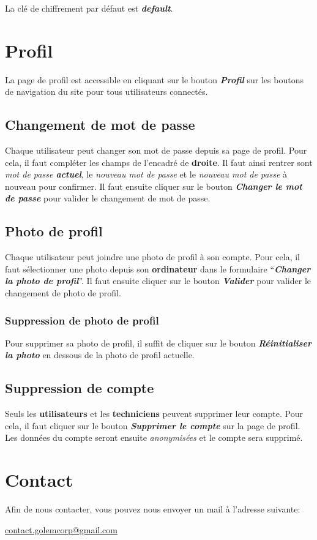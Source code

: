 \documentclass[12pt, a4paper]{article}
\begin{document}
\noindent La clé de chiffrement par défaut est \textit{\textbf{default}}.

\section{Profil}

La page de profil est accessible en cliquant sur le bouton \textit{\textbf{Profil}} sur les boutons de navigation du site pour tous utilisateurs connectés.

\subsection*{Changement de mot de passe}

Chaque utilisateur peut changer son mot de passe depuis sa page de profil.
Pour cela, il faut compléter les champs de l'encadré de \textbf{droite}.
Il faut ainsi rentrer sont \textit{mot de passe \textbf{actuel}}, le \textit{nouveau mot de passe} et le \textit{nouveau mot de passe} à nouveau pour confirmer.
Il faut ensuite cliquer sur le bouton \textit{\textbf{Changer le mot de passe}} pour valider le changement de mot de passe.

\subsection*{Photo de profil}

Chaque utilisateur peut joindre une photo de profil à son compte.
Pour cela, il faut sélectionner une photo depuis son \textbf{ordinateur} dans le formulaire ``\textit{\textbf{Changer la photo de profil}}''.
Il faut ensuite cliquer sur le bouton \textit{\textbf{Valider}} pour valider le changement de photo de profil.

\subsubsection*{Suppression de photo de profil}

Pour supprimer sa photo de profil, il suffit de cliquer sur le bouton \textit{\textbf{Réinitialiser la photo}} en dessous de la photo de profil actuelle.

\subsection*{Suppression de compte}

Seuls les \textbf{utilisateurs} et les \textbf{techniciens} peuvent supprimer leur compte.
Pour cela, il faut cliquer sur le bouton \textit{\textbf{Supprimer le compte}} sur la page de profil.
Les données du compte seront ensuite \textit{anonymisées} et le compte sera supprimé.

\section*{Contact}

Afin de nous contacter, vous pouvez nous envoyer un mail à l'adresse suivante:

\begin{center}
    \url{contact.golemcorp@gmail.com}
\end{center}
\end{document}
